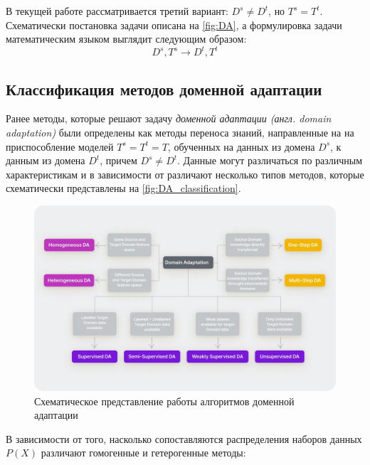 В текущей работе рассматривается третий вариант: $D^s \ne D^t$, но $T^s = T^t$. Схематически постановка задачи описана на \autoref{fig:DA}, а формулировка задачи математическим языком выглядит следующим образом:
$$D^s, T^s \to D^t, T^t$$

\subsection{Классификация методов доменной адаптации}

Ранее методы, которые решают задачу \textit{доменной адаптации (англ. domain adaptation)}  были определены как методы переноса знаний, направленные на на приспособление моделей $T^s = T^t = T$, обученных на данных из домена $D^s$, к данным из домена $D^t$, причем $D^s \ne D^t$. Данные могут различаться по различным характеристикам и в зависимости от различают несколько типов методов, которые схематически представлены на \autoref{fig:DA_classification}.

\begin{figure}[h]
	\centering
	\includegraphics[width=.85\textwidth]{./images/DA_classification.jpg}
	\caption{Схематическое представление работы алгоритмов доменной адаптации}
	\label{fig:DA_classification}
\end{figure}

В зависимости от того, насколько сопоставляются распределения наборов данных $P(X)$ различают гомогенные и гетерогенные методы:

